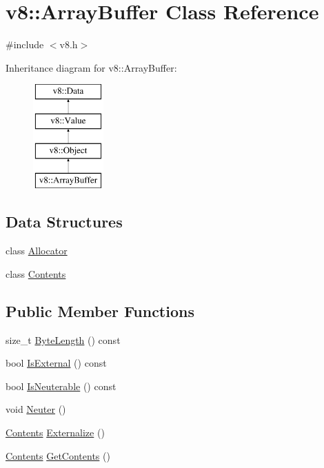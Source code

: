 \hypertarget{classv8_1_1ArrayBuffer}{}\section{v8\+:\+:Array\+Buffer Class Reference}
\label{classv8_1_1ArrayBuffer}


{\ttfamily \#include $<$v8.\+h$>$}

Inheritance diagram for v8\+:\+:Array\+Buffer\+:\begin{figure}[H]
\begin{center}
\leavevmode
\includegraphics[height=4.000000cm]{classv8_1_1ArrayBuffer}
\end{center}
\end{figure}
\subsection*{Data Structures}
\begin{DoxyCompactItemize}
\item 
class \hyperlink{classv8_1_1ArrayBuffer_1_1Allocator}{Allocator}
\item 
class \hyperlink{classv8_1_1ArrayBuffer_1_1Contents}{Contents}
\end{DoxyCompactItemize}
\subsection*{Public Member Functions}
\begin{DoxyCompactItemize}
\item 
size\+\_\+t \hyperlink{classv8_1_1ArrayBuffer_ab73b98ba6436b57c5a1b3d29429e0199}{Byte\+Length} () const 
\item 
bool \hyperlink{classv8_1_1ArrayBuffer_a50dd263917559439525048c623425c6f}{Is\+External} () const 
\item 
bool \hyperlink{classv8_1_1ArrayBuffer_aed177cd83c3368837f740fa2929b3c8d}{Is\+Neuterable} () const 
\item 
void \hyperlink{classv8_1_1ArrayBuffer_a3420f7d38a8fe20e8f40fb82e6acb325}{Neuter} ()
\item 
\hyperlink{classv8_1_1ArrayBuffer_1_1Contents}{Contents} \hyperlink{classv8_1_1ArrayBuffer_a8b90b72486cfacb4fbec157f4803f889}{Externalize} ()
\item 
\hyperlink{classv8_1_1ArrayBuffer_1_1Contents}{Contents} \hyperlink{classv8_1_1ArrayBuffer_ae44291df12ca35de9b519e7372aa640a}{Get\+Contents} ()
\end{DoxyCompactItemize}
